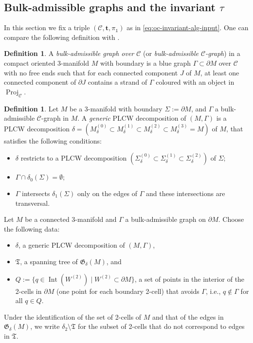\documentclass[11pt]{amsart}
\theoremstyle{definition}
\newtheorem{definition}[thm]{Definition}
\numberwithin{equation}{section}
\def\bd{{\partial}}
\def\mtr{{\mathbf{t}}} %
\newcommand{\Proj}{\operatorname{Proj}}
\def\intr{{\operatorname{Int}}}
\newcommand{\twoCell}[1]{{#1}^{(2)}}
\newcommand{\ourGraph}{\fG}
\newcommand{\spnTree}{\fT}
\newcommand{\loopEdge}{{\de_{2}\setminus\spnTree}}
\def\cC{\mathcal{C}}
\def\de{\delta}
\def\fG{\mathfrak{G}}
\def\fT{{\mathfrak{T}}}
\def\1{{\mathds{1}}}
\begin{document}
\subsection{Bulk-admissible graphs and the invariant \texorpdfstring{$\tau$}{}}
In this section we fix a triple $(\cC,\mtr,\pi_\1)$ as in \eqref{eq:oc-invariant-alg-input}. One can compare the following definition with \cite[Def.\,2]{RST24}.

\begin{definition}\label{def:adm-1}
A \emph{bulk-admissible graph over $\cC$} (or \textit{bulk-admissible $\cC$-graph}) in a compact oriented 3-manifold $M$ with boundary is a blue graph $\Gamma \subset \partial M$ over $\cC$ with no free ends such that for each connected component $J$ of $M$, at least one connected component of $\partial J$ contains a strand of $\Gamma$ coloured with an object in $\Proj_\cC$.
\end{definition}


\begin{definition}
Let $M$ be a 3-manifold with boundary $\Sigma := \partial M$, and $\Gamma$ a bulk-admissible $\cC$-graph in $M$. 
A \emph{generic} PLCW decomposition of $(M, \Gamma)$ is a PLCW decomposition $\delta = (M_\delta^{(0)} \subset M_\delta^{(1)} \subset M_\delta^{(2)} \subset M_\delta^{(3)} = M)$ of $M$, that satisfies the following conditions:
\begin{itemize}
\item 
$\delta$ restricts to a PLCW decomposition $(\Sigma_\delta^{(0)} \subset \Sigma_\delta^{(1)} \subset \Sigma_\delta^{(2)})$ of $\Sigma$;
\item 
$\Gamma \cap \delta_{0}(\Sigma) = \emptyset$;
\item 
$\Gamma$ intersects $\delta_{1}(\Sigma)$ only on the edges of $\Gamma$ and these intersections are transversal.
\end{itemize}
\end{definition}


Let $M$ be a connected 3-manifold and $\Gamma$ a bulk-admissible graph on $\bd M$. Choose the following data:
\begin{itemize}
\item $\delta$, a generic PLCW decomposition of $(M,\Gamma)$,
\item $\spnTree$, a spanning tree of $\ourGraph_{\de}(M)$, and
\item $Q := \{q \in \intr(\twoCell{W}) \mid \twoCell{W} \subset \bd M\}$, a set of points in the interior of the 2-cells in $\bd M$ (one point for each boundary 2-cell) that avoids $\Gamma$, i.e., $q \notin \Gamma$ for all $q \in Q$.
\end{itemize}
Under the identification of the set of 2-cells of $M$ and that of the edges in $\ourGraph_{\de}(M)$, we write $\loopEdge$ for the subset of 2-cells that do not correspond to edges in $\spnTree$. 
\end{document}
